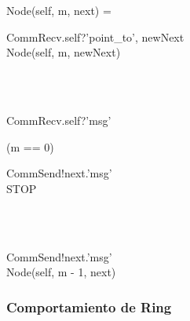 \begin{process}
Node(self, m, next) = \\ \quad
  \begin{block}
  CommRecv.self?\langle 'point\_to', newNext \rangle \then \\
  Node(self, m, newNext)
  \end{block} \\

  \Extchoice \\ \quad
  
  \begin{block}
  CommRecv.self?\langle 'msg' \rangle \then {} \\ \quad
    \begin{block}
    \If (m == 0) \Then {} \\ \quad
      \begin{block} 
      CommSend!next.\langle 'msg' \rangle \then \\
      STOP
      \end{block} \\
    \Else {} \\ \quad
      \begin{block}
      CommSend!next.\langle 'msg' \rangle \then \\
      Node(self, m - 1, next) 
      \end{block}
    \end{block}
  \end{block} 
\end{process}

% 

\subsubsection*{Comportamiento de Ring}


